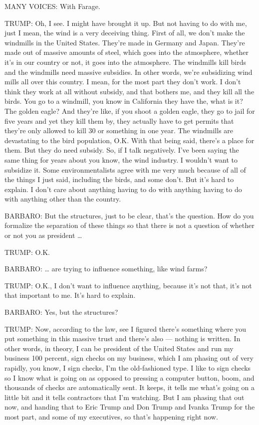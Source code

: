 MANY VOICES: With Farage.

TRUMP: Oh, I see. I might have brought it up. But not having to do with
me, just I mean, the wind is a very deceiving thing. First of all, we
don't make the windmills in the United States. They're made in Germany
and Japan. They're made out of massive amounts of steel, which goes into
the atmosphere, whether it's in our country or not, it goes into the
atmosphere. The windmills kill birds and the windmills need massive
subsidies. In other words, we're subsidizing wind mills all over this
country. I mean, for the most part they don't work. I don't think they
work at all without subsidy, and that bothers me, and they kill all the
birds. You go to a windmill, you know in California they have the, what
is it? The golden eagle? And they're like, if you shoot a golden eagle,
they go to jail for five years and yet they kill them by, they actually
have to get permits that they're only allowed to kill 30 or something in
one year. The windmills are devastating to the bird population, O.K.
With that being said, there's a place for them. But they do need
subsidy. So, if I talk negatively. I've been saying the same thing for
years about you know, the wind industry. I wouldn't want to subsidize
it. Some environmentalists agree with me very much because of all of the
things I just said, including the birds, and some don't. But it's hard
to explain. I don't care about anything having to do with anything
having to do with anything other than the country.

BARBARO: But the structures, just to be clear, that's the question. How
do you formalize the separation of these things so that there is not a
question of whether or not you as president \ldots{}

TRUMP: O.K.

BARBARO: \ldots{} are trying to influence something, like wind farms?

TRUMP: O.K., I don't want to influence anything, because it's not that,
it's not that important to me. It's hard to explain.

BARBARO: Yes, but the structures?

TRUMP: Now, according to the law, see I figured there's something where
you put something in this massive trust and there's also --- nothing is
written. In other words, in theory, I can be president of the United
States and run my business 100 percent, sign checks on my business,
which I am phasing out of very rapidly, you know, I sign checks, I'm the
old-fashioned type. I like to sign checks so I know what is going on as
opposed to pressing a computer button, boom, and thousands of checks are
automatically sent. It keeps, it tells me what's going on a little bit
and it tells contractors that I'm watching. But I am phasing that out
now, and handing that to Eric Trump and Don Trump and Ivanka Trump for
the most part, and some of my executives, so that's happening right now.

